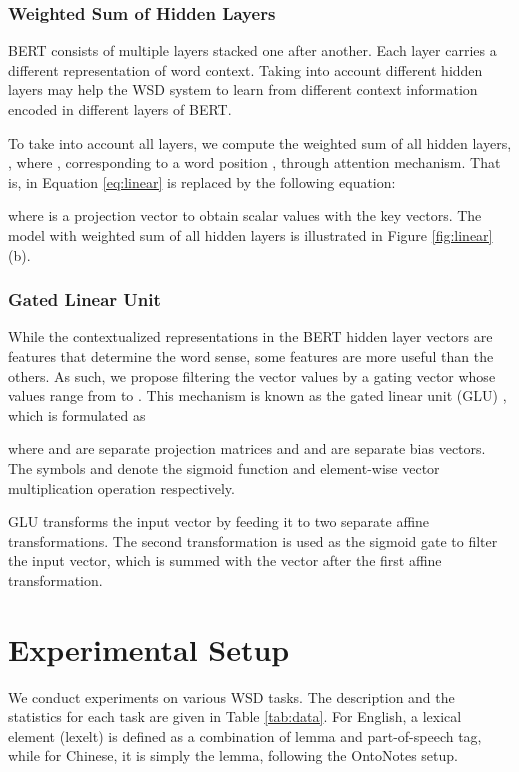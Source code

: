 \documentclass[11pt,a4paper]{article}
\begin{document}
\subsubsection{Weighted Sum of Hidden Layers}
\label{sec:incorporating_linear_lw}

BERT consists of multiple layers stacked one after another. Each layer carries a different representation of word context. Taking into account different hidden layers may help the WSD system to learn from different context information encoded in different layers of BERT.

To take into account all layers, we compute the weighted sum of all hidden layers, , where , corresponding to a word position , through attention mechanism. That is,  in Equation \ref{eq:linear} is replaced by the following equation:

where  is a projection vector to obtain scalar values with the key vectors. The model with weighted sum of all hidden layers is illustrated in Figure \ref{fig:linear}(b).

\subsubsection{Gated Linear Unit}
\label{sec:incorporating_linear_glu}

While the contextualized representations in the BERT hidden layer vectors are features that determine the word sense, some features are more useful than the others. As such, we propose filtering the vector values by a gating vector whose values range from  to . This mechanism is known as the gated linear unit (GLU) \cite{dauphin_language_2017}, which is formulated as

where  and  are separate projection matrices and  and  are separate bias vectors. The symbols  and  denote the sigmoid function and element-wise vector multiplication operation respectively.

GLU transforms the input vector  by feeding it to two separate affine transformations. The second transformation is used as the sigmoid gate to filter the input vector, which is summed with the vector after the first affine transformation.

\section{Experimental Setup}
\label{sec:exp}

We conduct experiments on various WSD tasks. The description and the statistics for each task are given in Table \ref{tab:data}. For English, a lexical element (lexelt) is defined as a combination of lemma and part-of-speech tag, while for Chinese, it is simply the lemma, following the OntoNotes setup.
\end{document}

